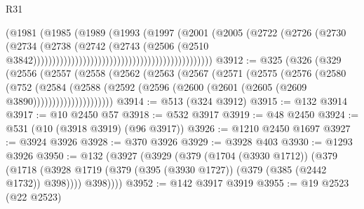 \begin{lexlean}{R31}
\begin{coremodule}
                                                                  (@1981
                                                                    (@1985
                                                                      (@1989
                                                                        (@1993
                                                                          (@1997
                                                                            (@2001
                                                                              (@2005
                                                                                (@2722
                                                                                  (@2726
                                                                                    (@2730
                                                                                      (@2734
                                                                                        (@2738
                                                                                          (@2742
                                                                                            (@2743
                                                                                              (@2506
                                                                                                (@2510
                                                                                                  @3842)))))))))))))))))))))))))))))))))))))))))))))))
@3912 := @325
    (@326
      (@329
        (@2556
          (@2557
            (@2558
              (@2562
                (@2563
                  (@2567
                    (@2571
                      (@2575
                        (@2576
                          (@2580
                            (@752
                              (@2584
                                (@2588
                                  (@2592
                                    (@2596 (@2600 (@2601 (@2605 (@2609 @3890)))))))))))))))))))))
@3914 := @513 (@324 @3912)
@3915 := @132 @3914
@3917 := @10 @2450 @57
@3918 := @532 @3917
@3919 := @48 @2450
@3924 := @531 (@10 (@3918 @3919) (@96 @3917))
@3926 := @1210 @2450 @1697
@3927 := @3924 @3926
@3928 := @370 @3926
@3929 := @3928 @403
@3930 := @1293 @3926
@3950 := @132
    (@3927
      (@3929
        (@379
          (@1704 (@3930 @1712))
          (@379
            (@1718 (@3928 @1719 (@379 (@395 (@3930 @1727)) (@379 (@385 (@2442 @1732)) @398))))
            @398))))
@3952 := @142 @3917 @3919
@3955 := @19 @2523 (@22 @2523)

\end{coremodule}
\end{lexlean}
